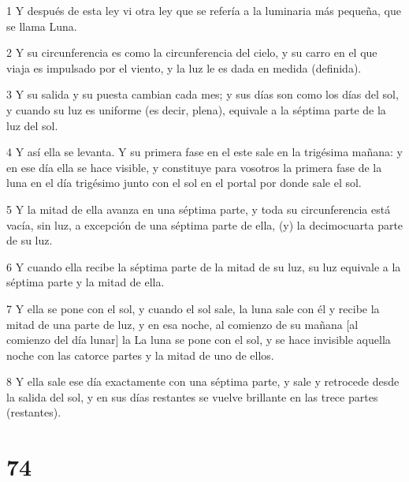 \par 1 Y después de esta ley vi otra ley que se refería a la luminaria más pequeña, que se llama Luna.
\par 2 Y su circunferencia es como la circunferencia del cielo, y su carro en el que viaja es impulsado por el viento, y la luz le es dada en medida (definida).
\par 3 Y su salida y su puesta cambian cada mes; y sus días son como los días del sol, y cuando su luz es uniforme (es decir, plena), equivale a la séptima parte de la luz del sol.
\par 4 Y así ella se levanta. Y su primera fase en el este sale en la trigésima mañana: y en ese día ella se hace visible, y constituye para vosotros la primera fase de la luna en el día trigésimo junto con el sol en el portal por donde sale el sol.
\par 5 Y la mitad de ella avanza en una séptima parte, y toda su circunferencia está vacía, sin luz, a excepción de una séptima parte de ella, (y) la decimocuarta parte de su luz.
\par 6 Y cuando ella recibe la séptima parte de la mitad de su luz, su luz equivale a la séptima parte y la mitad de ella.
\par 7 Y ella se pone con el sol, y cuando el sol sale, la luna sale con él y recibe la mitad de una parte de luz, y en esa noche, al comienzo de su mañana [al comienzo del día lunar] la La luna se pone con el sol, y se hace invisible aquella noche con las catorce partes y la mitad de uno de ellos.
\par 8 Y ella sale ese día exactamente con una séptima parte, y sale y retrocede desde la salida del sol, y en sus días restantes se vuelve brillante en las trece partes (restantes).

\chapter{74}


